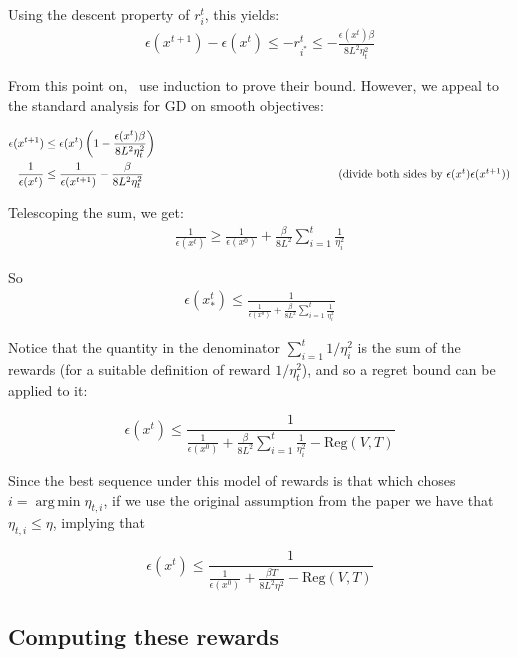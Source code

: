 \documentclass[letterpaper]{article}
\DeclareMathOperator*{\argmin}{arg\,min}
\newcommand{\istar}{i^*}
\newcommand{\comment}[1]{%
  \text{\phantom{(#1)}} \tag{#1}
}
\begin{document}
Using the descent property of $r_i^t$, this yields:
\begin{align}
    \epsilon(x^{t+1}) - \epsilon(x^t) \leq -r_{\istar}^t \leq -\frac{\epsilon(x^t)\beta}{8L^2 \eta_t^2}
\end{align}

From this point on,~\cite{salehi2018coordinate} use induction to prove their bound. However, we appeal to the standard analysis for GD on smooth objectives:

\begin{align}
    \epsilon(x^{t+1}) &\leq \epsilon(x^t) \left(1 - \frac{\epsilon(x^t) \beta}{8L^2 \eta_t^2}\right) \\ 
    \frac{1}{\epsilon(x^t)} &\leq \frac{1}{\epsilon(x^{t+1})} - \frac{\beta}{8L^2 \eta_t^2} \comment{divide both sides by $\epsilon(x^t)\epsilon(x^{t+1}$)}
\end{align}

Telescoping the sum, we get:
\begin{align}
    \frac{1}{\epsilon(x^t)} \geq \frac{1}{\epsilon(x^0)} + \frac{\beta}{8L^2} \sum_{i=1}^t \frac{1}{\eta_i^2}
\end{align}

So
\begin{align}
    \epsilon(x^t_*) \leq \frac{1}{\frac{1}{\epsilon(x^0)}  + \frac{\beta}{8L^2} \sum_{i=1}^t \frac{1}{\eta_i^2}}
\end{align}

Notice that the quantity in the denominator $\sum_{i=1}^t 1/\eta_i^2$ is the sum of the rewards (for a suitable definition of reward $1/\eta_t^2$), and so a regret bound can be applied to it:

\begin{equation}
    \epsilon(x^t) \leq \frac{1}{\frac{1}{\epsilon(x^0)}  + \frac{\beta}{8L^2} \sum_{i=1}^t \frac{1}{\eta_i^2} - \text{Reg}(V,T)}
\end{equation}

Since the best sequence under this model of rewards is that which choses $i = \argmin \eta_{t,i}$, if we use the original assumption from the paper we have that $\eta_{t,i} \leq \eta$, implying that

\begin{equation}
    \epsilon(x^t) \leq \frac{1}{\frac{1}{\epsilon(x^0)}  + \frac{\beta T}{8L^2 \eta^2} - \text{Reg}(V,T)}
\end{equation}

\subsection{Computing these rewards}
\end{document}
